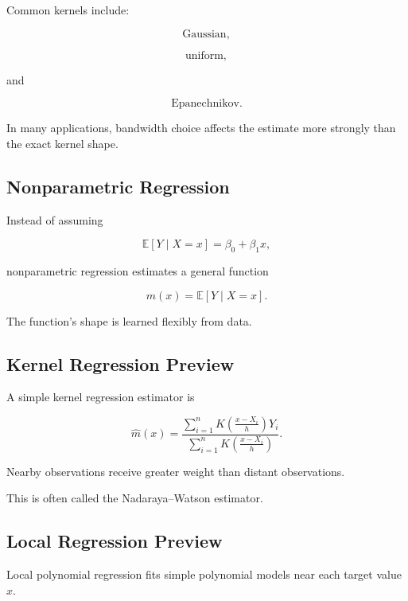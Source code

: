 Common kernels include:

\[
\boxed{
\text{Gaussian},
}
\]

\[
\boxed{
\text{uniform},
}
\]

and

\[
\boxed{
\text{Epanechnikov}.
}
\]

In many applications, bandwidth choice affects the estimate more strongly
than the exact kernel shape.

\subsection{Nonparametric Regression}
\label{subsec:nonparametric-regression}

Instead of assuming

\[
\mathbb{E}[Y\mid X=x]
=
\beta_0+\beta_1x,
\]

nonparametric regression estimates a general function

\[
\boxed{
m(x)
=
\mathbb{E}[Y\mid X=x].
}
\]

The function's shape is learned flexibly from data.

\subsection{Kernel Regression Preview}
\label{subsec:kernel-regression-preview}

A simple kernel regression estimator is

\[
\boxed{
\widehat{m}(x)
=
\frac{
\sum_{i=1}^{n}
K
\left(
\frac{x-X_i}{h}
\right)
Y_i
}{
\sum_{i=1}^{n}
K
\left(
\frac{x-X_i}{h}
\right)
}.
}
\]

Nearby observations receive greater weight than distant observations.

This is often called the Nadaraya--Watson estimator.

\subsection{Local Regression Preview}
\label{subsec:local-regression-preview}

Local polynomial regression fits simple polynomial models near each
target value \(x\).

